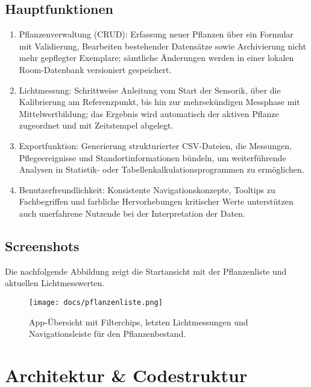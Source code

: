 \documentclass[14pt,a4paper]{report}
\begin{document}
\section{Hauptfunktionen}
\begin{enumerate}
    \item Pflanzenverwaltung (CRUD): Erfassung neuer Pflanzen über ein Formular mit Validierung, Bearbeiten bestehender Datensätze sowie Archivierung nicht mehr gepflegter Exemplare; sämtliche Änderungen werden in einer lokalen Room-Datenbank versioniert gespeichert.
    \item Lichtmessung: Schrittweise Anleitung vom Start der Sensorik, über die Kalibrierung am Referenzpunkt, bis hin zur mehrsekündigen Messphase mit Mittelwertbildung; das Ergebnis wird automatisch der aktiven Pflanze zugeordnet und mit Zeitstempel abgelegt.
    \item Exportfunktion: Generierung strukturierter CSV-Dateien, die Messungen, Pflegeereignisse und Standortinformationen bündeln, um weiterführende Analysen in Statistik- oder Tabellenkalkulationsprogrammen zu ermöglichen.
    \item Benutzerfreundlichkeit: Konsistente Navigationskonzepte, Tooltips zu Fachbegriffen und farbliche Hervorhebungen kritischer Werte unterstützen auch unerfahrene Nutzende bei der Interpretation der Daten.
\end{enumerate}

\section{Screenshots}
Die nachfolgende Abbildung zeigt die Startansicht mit der Pflanzenliste und aktuellen Lichtmesswerten.

\begin{figure}[h!]
    \centering
    \texttt{[image: docs/pflanzenliste.png]}
    \caption{App-Übersicht mit Filterchips, letzten Lichtmessungen und Navigationsleiste für den Pflanzenbestand.}
\end{figure}

\chapter{Architektur \& Codestruktur}
\end{document}
